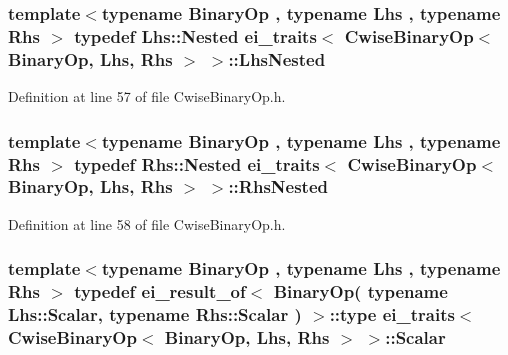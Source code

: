 \hypertarget{structei__traits_3_01_cwise_binary_op_3_01_binary_op_00_01_lhs_00_01_rhs_01_4_01_4_a45767979a6f13e5e60300f1043a39eea}{
\subsubsection[{Lhs\-Nested}]{\setlength{\rightskip}{0pt plus 5cm}template$<$typename Binary\-Op , typename Lhs , typename Rhs $>$ typedef Lhs\-::\-Nested {\bf ei\-\_\-traits}$<$ {\bf Cwise\-Binary\-Op}$<$ Binary\-Op, Lhs, Rhs $>$ $>$\-::{\bf Lhs\-Nested}}}\label{structei__traits_3_01_cwise_binary_op_3_01_binary_op_00_01_lhs_00_01_rhs_01_4_01_4_a45767979a6f13e5e60300f1043a39eea}


Definition at line 57 of file Cwise\-Binary\-Op.\-h.

\hypertarget{structei__traits_3_01_cwise_binary_op_3_01_binary_op_00_01_lhs_00_01_rhs_01_4_01_4_a3e3befd415499f8cc9996a3a18273f95}{
\subsubsection[{Rhs\-Nested}]{\setlength{\rightskip}{0pt plus 5cm}template$<$typename Binary\-Op , typename Lhs , typename Rhs $>$ typedef Rhs\-::\-Nested {\bf ei\-\_\-traits}$<$ {\bf Cwise\-Binary\-Op}$<$ Binary\-Op, Lhs, Rhs $>$ $>$\-::{\bf Rhs\-Nested}}}\label{structei__traits_3_01_cwise_binary_op_3_01_binary_op_00_01_lhs_00_01_rhs_01_4_01_4_a3e3befd415499f8cc9996a3a18273f95}


Definition at line 58 of file Cwise\-Binary\-Op.\-h.

\hypertarget{structei__traits_3_01_cwise_binary_op_3_01_binary_op_00_01_lhs_00_01_rhs_01_4_01_4_ab9a2ab6f8760a4b4f31dc6c4488c3f62}{
\subsubsection[{Scalar}]{\setlength{\rightskip}{0pt plus 5cm}template$<$typename Binary\-Op , typename Lhs , typename Rhs $>$ typedef {\bf ei\-\_\-result\-\_\-of}$<$ Binary\-Op( typename Lhs\-::\-Scalar, typename Rhs\-::\-Scalar ) $>$\-::{\bf type} {\bf ei\-\_\-traits}$<$ {\bf Cwise\-Binary\-Op}$<$ Binary\-Op, Lhs, Rhs $>$ $>$\-::{\bf Scalar}}}\label{structei__traits_3_01_cwise_binary_op_3_01_binary_op_00_01_lhs_00_01_rhs_01_4_01_4_ab9a2ab6f8760a4b4f31dc6c4488c3f62}


